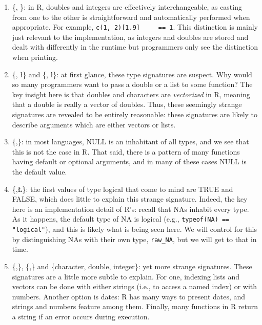 \documentclass[acmsmall,10pt,review,anonymous]{acmart}\settopmatter{printfolios=true,printccs=false,printacmref=false}
\newcommand{\code}[1]{\lstinline|#1|\xspace}
\begin{document}
\begin{enumerate}
\item \{\D, \I\}: in R, doubles and integers are effectively
  interchangeable, as casting from one to the other is straightforward and
  automatically performed when appropriate.  For example, \code{c(1, 2)[1.9]
    == 1}.  This distinction is mainly just relevant to the implementation,
  as integers and doubles are stored and dealt with differently in the
  runtime but programmers only see the distinction when printing.

\item \{\D, \l\} and \{\C, \l\}: at first glance, these type signatures are
  suspect.  Why would so many programmers want to pass a double or a list to
  some function?  The key insight here is that doubles and characters are
  {\it vectorized} in R, meaning that a double is really a vector of
  doubles.  Thus, these seemingly strange signatures are revealed to be
  entirely reasonable: these signatures are likely to describe arguments
  which are either vectors or lists.

\item \{\ANY,\sN\}: in most languages, NULL is an inhabitant of all types,
  and we see that this is not the case in R.  That said, there is a pattern
  of many functions having default or optional arguments, and in many of
  these cases NULL is the default value.

\item \{\D,\L\}: the first values of type logical that come to mind are TRUE
  and FALSE, which does little to explain this strange signature.  Indeed,
  the key here is an implementation detail of R's: recall that NAs inhabit
  every type.  As it happens, the default type of NA is logical (e.g.,
  \code{typeof(NA) == "logical"}), and this is likely what is being seen
  here.  We will control for this by distinguishing NAs with their own type,
  {\tt raw\_NA}, but we will get to that in time.

\item \{\C,\D\}, \{\C,\I\} and \{character, double, integer\}: yet more
  strange signatures.  These signatures are a little more subtle to explain.
  For one, indexing lists and vectors can be done with either strings (i.e.,
  to access a named index) or with numbers.  Another option is dates: R has
  many ways to present dates, and strings and numbers feature among them.
  Finally, many  functions in R return a string if an error
  occurs during execution.

\end{enumerate}
\end{document}
